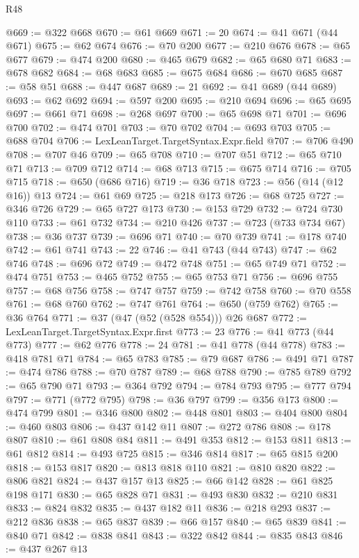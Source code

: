 \begin{lexlean}{R48}
\begin{coremodule}
@669 := @322 @668
@670 := @61 @669
@671 := 20
@674 := @41 @671 (@44 @671)
@675 := @62 @674
@676 := @70 @200
@677 := @210 @676
@678 := @65 @677
@679 := @474 @200
@680 := @465 @679
@682 := @65 @680 @71
@683 := @678 @682
@684 := @68 @683
@685 := @675 @684
@686 := @670 @685
@687 := @58 @51
@688 := @447 @687
@689 := 21
@692 := @41 @689 (@44 @689)
@693 := @62 @692
@694 := @597 @200
@695 := @210 @694
@696 := @65 @695
@697 := @661 @71
@698 := @268 @697
@700 := @65 @698 @71
@701 := @696 @700
@702 := @474 @701
@703 := @70 @702
@704 := @693 @703
@705 := @688 @704
@706 := LexLeanTarget.TargetSyntax.Expr.field
@707 := @706 @490
@708 := @707 @46
@709 := @65 @708
@710 := @707 @51
@712 := @65 @710 @71
@713 := @709 @712
@714 := @68 @713
@715 := @675 @714
@716 := @705 @715
@718 := @650 (@686 @716)
@719 := @36 @718
@723 := @56 (@14 (@12 @16)) @13
@724 := @61 @69
@725 := @218 @173
@726 := @68 @725
@727 := @346 @726
@729 := @65 @727 @173
@730 := @153 @729
@732 := @724 @730 @110
@733 := @61 @732
@734 := @210 @426
@737 := @723 (@733 @734 @67)
@738 := @36 @737
@739 := @696 @71
@740 := @70 @739
@741 := @178 @740
@742 := @61 @741
@743 := 22
@746 := @41 @743 (@44 @743)
@747 := @62 @746
@748 := @696 @72
@749 := @472 @748
@751 := @65 @749 @71
@752 := @474 @751
@753 := @465 @752
@755 := @65 @753 @71
@756 := @696 @755
@757 := @68 @756
@758 := @747 @757
@759 := @742 @758
@760 := @70 @558
@761 := @68 @760
@762 := @747 @761
@764 := @650 (@759 @762)
@765 := @36 @764
@771 := @37 (@47 (@52 (@528 @554))) @26 @687
@772 := LexLeanTarget.TargetSyntax.Expr.first
@773 := 23
@776 := @41 @773 (@44 @773)
@777 := @62 @776
@778 := 24
@781 := @41 @778 (@44 @778)
@783 := @418 @781 @71
@784 := @65 @783
@785 := @79 @687
@786 := @491 @71
@787 := @474 @786
@788 := @70 @787
@789 := @68 @788
@790 := @785 @789
@792 := @65 @790 @71
@793 := @364 @792
@794 := @784 @793
@795 := @777 @794
@797 := @771 (@772 @795)
@798 := @36 @797
@799 := @356 @173
@800 := @474 @799
@801 := @346 @800
@802 := @448 @801
@803 := @404 @800
@804 := @460 @803
@806 := @437 @142 @11
@807 := @272 @786
@808 := @178 @807
@810 := @61 @808 @84
@811 := @491 @353
@812 := @153 @811
@813 := @61 @812
@814 := @493 @725
@815 := @346 @814
@817 := @65 @815 @200
@818 := @153 @817
@820 := @813 @818 @110
@821 := @810 @820
@822 := @806 @821
@824 := @437 @157 @13
@825 := @66 @142
@828 := @61 @825 @198 @171
@830 := @65 @828 @71
@831 := @493 @830
@832 := @210 @831
@833 := @824 @832
@835 := @437 @182 @11
@836 := @218 @293
@837 := @212 @836
@838 := @65 @837
@839 := @66 @157
@840 := @65 @839
@841 := @840 @71
@842 := @838 @841
@843 := @322 @842
@844 := @835 @843
@846 := @437 @267 @13

\end{coremodule}
\end{lexlean}
